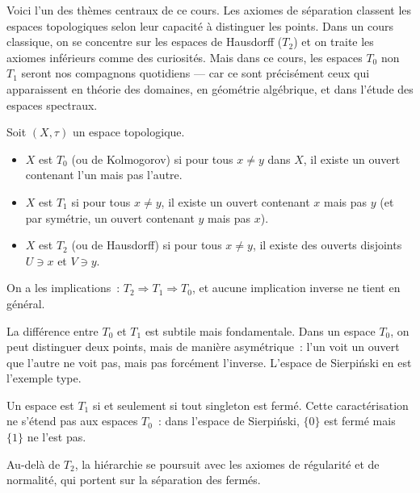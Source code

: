 Voici l'un des th\`emes centraux de ce cours. Les axiomes de s\'eparation
classent les espaces topologiques selon leur capacit\'e \`a \og distinguer\fg{}
les points. Dans un cours classique, on se concentre sur les espaces de
Hausdorff ($T_2$) et on traite les axiomes inf\'erieurs comme des
curiosit\'es. Mais dans ce cours, les espaces $T_0$ non $T_1$ seront nos
compagnons quotidiens --- car ce sont pr\'ecis\'ement ceux qui apparaissent
en th\'eorie des domaines, en g\'eom\'etrie alg\'ebrique, et dans l'\'etude des
espaces spectraux.

\begin{definition}[Axiomes $T_0$, $T_1$, $T_2$]
Soit $(X,\tau)$ un espace topologique.
\begin{itemize}
  \item $X$ est \emph{$T_0$} (ou de Kolmogorov) si pour tous $x \neq y$ dans $X$, il
    existe un ouvert contenant l'un mais pas l'autre.
  \item $X$ est \emph{$T_1$} si pour tous $x \neq y$, il existe un ouvert contenant $x$
    mais pas $y$ (et par sym\'etrie, un ouvert contenant $y$ mais pas $x$).
  \item $X$ est \emph{$T_2$} (ou de Hausdorff) si pour tous $x \neq y$, il existe des
    ouverts disjoints $U \ni x$ et $V \ni y$.
\end{itemize}
\end{definition}

\begin{proposition}
On a les implications~: $T_2 \Rightarrow T_1 \Rightarrow T_0$, et aucune implication
inverse ne tient en g\'en\'eral.
\end{proposition}

La diff\'erence entre $T_0$ et $T_1$ est subtile mais fondamentale. Dans un
espace $T_0$, on peut \og distinguer\fg{} deux points, mais de mani\`ere
asym\'etrique~: l'un voit un ouvert que l'autre ne voit pas, mais pas
forc\'ement l'inverse. L'espace de Sierpi\'nski en est l'exemple type.

\begin{remarque}
Un espace est $T_1$ si et seulement si tout singleton est ferm\'e. Cette caract\'erisation
ne s'\'etend pas aux espaces $T_0$~: dans l'espace de Sierpi\'nski, $\{0\}$ est ferm\'e
mais $\{1\}$ ne l'est pas.
\end{remarque}

Au-del\`a de $T_2$, la hi\'erarchie se poursuit avec les axiomes de
r\'egularit\'e et de normalit\'e, qui portent sur la s\'eparation des ferm\'es.

